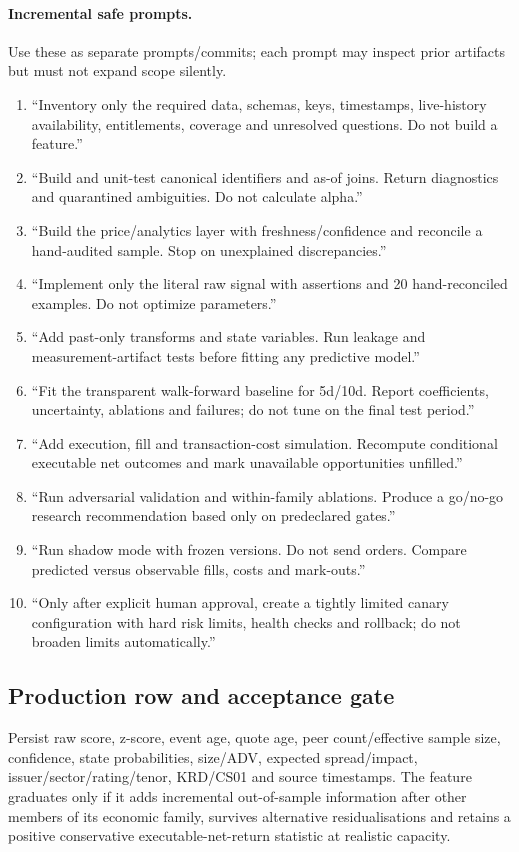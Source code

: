 \documentclass[10pt]{article}
\begin{document}
\paragraph{Incremental safe prompts.} Use these as separate prompts/commits; each prompt may inspect prior artifacts but must not expand scope silently.
\begin{enumerate}[leftmargin=2em,label=\textbf{P\arabic*.}]
\item ``Inventory only the required data, schemas, keys, timestamps, live-history availability, entitlements, coverage and unresolved questions. Do not build a feature.''
\item ``Build and unit-test canonical identifiers and as-of joins. Return diagnostics and quarantined ambiguities. Do not calculate alpha.''
\item ``Build the price/analytics layer with freshness/confidence and reconcile a hand-audited sample. Stop on unexplained discrepancies.''
\item ``Implement only the literal raw signal with assertions and 20 hand-reconciled examples. Do not optimize parameters.''
\item ``Add past-only transforms and state variables. Run leakage and measurement-artifact tests before fitting any predictive model.''
\item ``Fit the transparent walk-forward baseline for 5d/10d. Report coefficients, uncertainty, ablations and failures; do not tune on the final test period.''
\item ``Add execution, fill and transaction-cost simulation. Recompute conditional executable net outcomes and mark unavailable opportunities unfilled.''
\item ``Run adversarial validation and within-family ablations. Produce a go/no-go research recommendation based only on predeclared gates.''
\item ``Run shadow mode with frozen versions. Do not send orders. Compare predicted versus observable fills, costs and mark-outs.''
\item ``Only after explicit human approval, create a tightly limited canary configuration with hard risk limits, health checks and rollback; do not broaden limits automatically.''
\end{enumerate}

\subsection{Production row and acceptance gate}
Persist raw score, z-score, event age, quote age, peer count/effective sample size, confidence, state probabilities, size/ADV, expected spread/impact, issuer/sector/rating/tenor, KRD/CS01 and source timestamps. The feature graduates only if it adds incremental out-of-sample information after other members of its economic family, survives alternative residualisations and retains a positive conservative executable-net-return statistic at realistic capacity.\newpage
\end{document}
